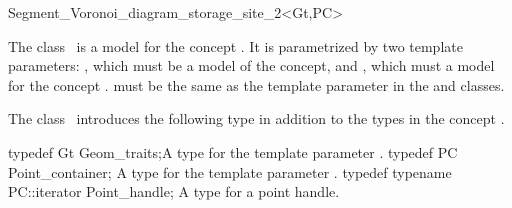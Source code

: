 



\begin{ccRefClass}{Segment_Voronoi_diagram_storage_site_2<Gt,PC>}


\ccDefinition
  
The class \ccRefName\ is a model for the concept
. It is parametrized by two
template parameters: , which must be a model of the
 concept, and , which must
a model for the concept .  must be the
same as the template parameter in the
 and
 classes.


\ccIsModel
{}

\ccTypes

The class \ccRefName\ introduces the following type in addition to the
types in the concept .

\ccTypedef
{typedef Gt Geom_traits;}{A type for the template parameter .}
\ccGlue
\ccTypedef
{typedef PC Point_container;}
{A type for the template parameter .}
\ccGlue
\ccTypedef
{typedef typename PC::iterator Point_handle;}
{A type for a point handle.}



\end{ccRefClass}
